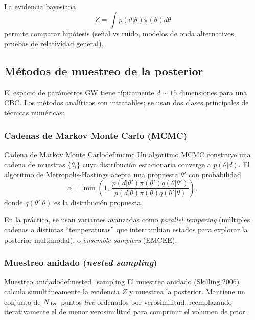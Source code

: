 La evidencia bayesiana
\begin{equation}
Z=\int p(d|\theta)\pi(\theta)d\theta
\end{equation}
permite comparar hipótesis (señal vs ruido, modelos de onda alternativos, pruebas de relatividad general).

\subsection{Métodos de muestreo de la posterior}

El espacio de parámetros GW tiene típicamente $d\sim 15$ dimensiones para una CBC. Los métodos analíticos son intratables; se usan dos clases principales de técnicas numéricas:

\subsubsection{Cadenas de Markov Monte Carlo (MCMC)}

\begin{definicion}{Cadena de Markov Monte Carlo}{def:mcmc}
Un algoritmo MCMC construye una cadena de muestras $\{\theta_i\}$ cuya distribución estacionaria converge a $p(\theta|d)$. El algoritmo de Metropolis-Hastings acepta una propuesta $\theta'$ con probabilidad
\begin{equation}
  \alpha = \min\!\left(1,\,\frac{p(d|\theta')\pi(\theta')q(\theta|\theta')}{p(d|\theta)\pi(\theta)q(\theta'|\theta)}\right),
  \label{eq:mh_accept}
\end{equation}
donde $q(\theta'|\theta)$ es la distribución propuesta.
\end{definicion}

En la práctica, se usan variantes avanzadas como \emph{parallel tempering} (múltiples cadenas a distintas ``temperaturas'' que intercambian estados para explorar la posterior multimodal), o \emph{ensemble samplers} (EMCEE).

\subsubsection{Muestreo anidado (\emph{nested sampling})}

\begin{definicion}{Muestreo anidado}{def:nested_sampling}
El muestreo anidado (Skilling 2006) calcula simultáneamente la evidencia $Z$ y muestrea la posterior. Mantiene un conjunto de $N_{\rm live}$ puntos \emph{live} ordenados por verosimilitud, reemplazando iterativamente el de menor verosimilitud para comprimir el volumen de prior.
\end{definicion}

